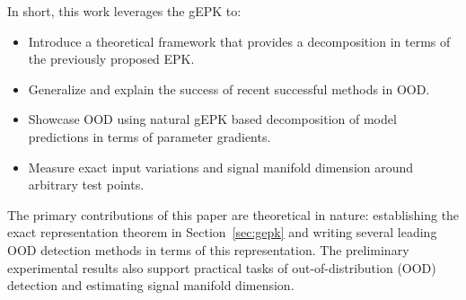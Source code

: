 In short, this work leverages the gEPK to:
\begin{itemize}
    \item Introduce a theoretical framework that provides a decomposition in terms of the previously proposed EPK. %
    \item Generalize and explain the success of recent successful methods in OOD.
    \item Showcase OOD using natural gEPK based decomposition of model predictions in terms of parameter gradients.
    \item Measure exact input variations and signal manifold dimension around arbitrary test points.

\end{itemize}
The primary contributions of this paper are theoretical in nature: establishing the exact representation theorem in Section~\ref{sec:gepk} and writing several leading OOD detection methods in terms of this representation. The preliminary experimental results also support practical tasks of out-of-distribution (OOD) detection and estimating signal manifold dimension. 

\label{sec:input}








